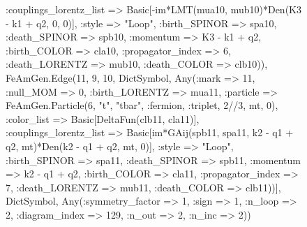 \documentclass{revtex4}
\begin{document}
\begin{figure}[!htb]
\begin{center}
{:couplings_lorentz_list => Basic[-im*LMT(mua10, mub10)*Den(K3 - k1 + q2, 0, 0)], :style => "Loop", :birth_SPINOR => spa10, :death_SPINOR => spb10, :momentum => K3 - k1 + q2, :birth_COLOR => cla10, :propagator_index => 6, :death_LORENTZ => mub10, :death_COLOR => clb10)), FeAmGen.Edge(11, 9, 10, Dict{Symbol, Any}(:mark => 11, :null_MOM => 0, :birth_LORENTZ => mua11, :particle => FeAmGen.Particle(6, "t", "tbar", :fermion, :triplet, 2//3, mt, 0), :color_list => Basic[DeltaFun(clb11, cla11)], :couplings_lorentz_list => Basic[im*GAij(spb11, spa11, k2 - q1 + q2, mt)*Den(k2 - q1 + q2, mt, 0)], :style => "Loop", :birth_SPINOR => spa11, :death_SPINOR => spb11, :momentum => k2 - q1 + q2, :birth_COLOR => cla11, :propagator_index => 7, :death_LORENTZ => mub11, :death_COLOR => clb11))], Dict{Symbol, Any}(:symmetry_factor => 1, :sign => 1, :n_loop => 2, :diagram_index => 129, :n_out => 2, :n_inc => 2)) 
}
\end{center}
\end{figure}
\end{document}
